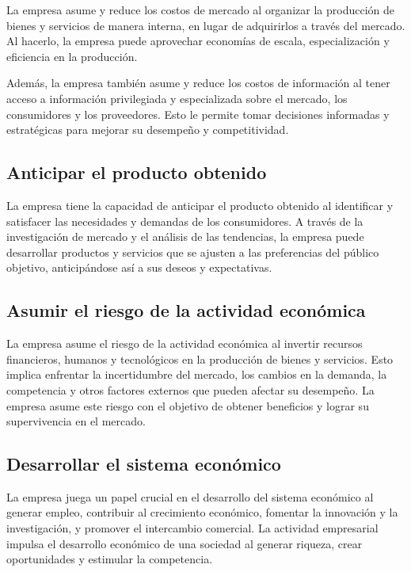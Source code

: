 \documentclass[
  man,
  floatsintext,
  longtable,
  a4paper,
  nolmodern,
  notxfonts,
  notimes,
  12pt,
  colorlinks=true,linkcolor=blue,citecolor=blue,urlcolor=blue]{apa7}
\begin{document}
La empresa asume y reduce los costos de mercado al organizar la
producción de bienes y servicios de manera interna, en lugar de
adquirirlos a través del mercado. Al hacerlo, la empresa puede
aprovechar economías de escala, especialización y eficiencia en la
producción.

Además, la empresa también asume y reduce los costos de información al
tener acceso a información privilegiada y especializada sobre el
mercado, los consumidores y los proveedores. Esto le permite tomar
decisiones informadas y estratégicas para mejorar su desempeño y
competitividad.

\subsection{Anticipar el producto
obtenido}\label{anticipar-el-producto-obtenido}

La empresa tiene la capacidad de anticipar el producto obtenido al
identificar y satisfacer las necesidades y demandas de los consumidores.
A través de la investigación de mercado y el análisis de las tendencias,
la empresa puede desarrollar productos y servicios que se ajusten a las
preferencias del público objetivo, anticipándose así a sus deseos y
expectativas.

\subsection{Asumir el riesgo de la actividad
económica}\label{asumir-el-riesgo-de-la-actividad-econuxf3mica}

La empresa asume el riesgo de la actividad económica al invertir
recursos financieros, humanos y tecnológicos en la producción de bienes
y servicios. Esto implica enfrentar la incertidumbre del mercado, los
cambios en la demanda, la competencia y otros factores externos que
pueden afectar su desempeño. La empresa asume este riesgo con el
objetivo de obtener beneficios y lograr su supervivencia en el mercado.

\subsection{Desarrollar el sistema
económico}\label{desarrollar-el-sistema-econuxf3mico}

La empresa juega un papel crucial en el desarrollo del sistema económico
al generar empleo, contribuir al crecimiento económico, fomentar la
innovación y la investigación, y promover el intercambio comercial. La
actividad empresarial impulsa el desarrollo económico de una sociedad al
generar riqueza, crear oportunidades y estimular la competencia.
\end{document}
